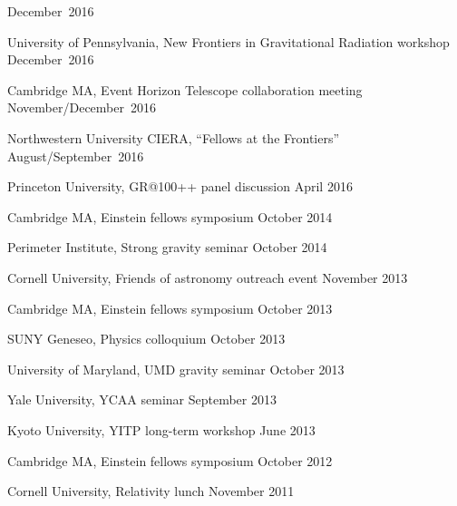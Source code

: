 \begin{etaremune}
  \hfill{}
  December~2016
\item
  University of Pennsylvania,
  New Frontiers in Gravitational Radiation workshop
  \hfill{}
  December~2016
\item
  Cambridge MA,
  Event Horizon Telescope collaboration meeting
  \hfill{}
  November/December~2016
\item
  Northwestern University CIERA,
  ``Fellows at the Frontiers''
  \hfill{}
  August/September~2016
\item
  Princeton University,
  GR@100++ panel discussion
  \hfill{}
  April 2016
\item
  Cambridge MA,
  Einstein fellows symposium
  \hfill{}
  October 2014
\item
  Perimeter Institute,
  Strong gravity seminar
  \hfill{}
  October 2014
\item
  Cornell University,
  Friends of astronomy outreach event
  \hfill{}
  November 2013
\item
  Cambridge MA,
  Einstein fellows symposium
  \hfill{}
  October 2013
\item
  SUNY Geneseo,
  Physics colloquium
  \hfill{}
  October 2013
\item
  University of Maryland,
  UMD gravity seminar
  \hfill{}
  October 2013
\item
  Yale University,
  YCAA seminar
  \hfill{}
  September 2013
\item
  Kyoto University,
  YITP long-term workshop
  \hfill{}
  June 2013
\item
  Cambridge MA,
  Einstein fellows symposium
  \hfill{}
  October 2012
\item
  Cornell University,
  Relativity lunch
  \hfill{}
  November 2011
\end{etaremune}

